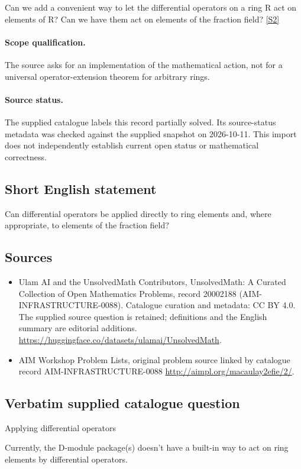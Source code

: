 \documentclass[11pt]{article}
\begin{document}
Can we add a convenient way to let the differential operators on a ring R act on elements of R? Can we have them act on elements of the fraction field? \href{http://aimpl.org/macaulay2efie/2/}{[S2]}
\paragraph{Scope qualification.}
The source asks for an implementation of the mathematical action, not for a universal operator-extension theorem for arbitrary rings.
\paragraph{Source status.}
The supplied catalogue labels this record partially solved. Its source-status metadata was checked against the supplied snapshot on 2026-10-11. This import does not independently establish current open status or mathematical correctness.
\subsection{Short English statement}
Can differential operators be applied directly to ring elements and, where appropriate, to elements of the fraction field?
\subsection{Sources}
\begin{itemize}
\item[S1] Ulam AI and the UnsolvedMath Contributors, UnsolvedMath: A Curated Collection of Open Mathematics Problems, record 20002188 (AIM-INFRASTRUCTURE-0088). Catalogue curation and metadata: CC BY 4.0. The supplied source question is retained; definitions and the English summary are editorial additions.
\url{https://huggingface.co/datasets/ulamai/UnsolvedMath}.
\item[S2] AIM Workshop Problem Lists, original problem source linked by catalogue record AIM-INFRASTRUCTURE-0088
\url{http://aimpl.org/macaulay2efie/2/}.
\end{itemize}
\subsection{Verbatim supplied catalogue question}
Applying differential operators

Currently, the D-module package(s) doesn't have a built-in way to act on ring elements by differential operators.
\end{document}
